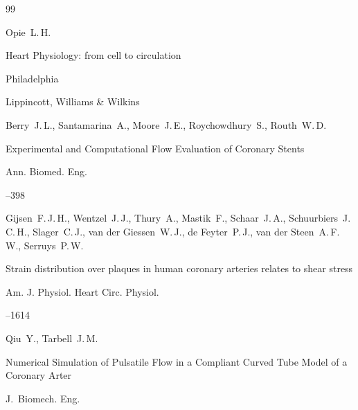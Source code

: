 \begin{thebibliography}{99}




\by Opie~L.\,H. 

\book Heart Physiology: from cell to circulation

\publaddr Philadelphia

\publ Lippincott, Williams \& Wilkins








\by Berry~J.\,L., Santamarina~A., Moore~J.\,E., Roychowdhury~S., Routh~W.\,D.

\paper Experimental and Computational Flow Evaluation of Coronary Stents 

\jour Ann. Biomed. Eng. 



--398







\by Gijsen~F.\,J.\,H., Wentzel~J.\,J., Thury~A., Mastik~F., Schaar~J.\,A., Schuurbiers~J.\,C.\,H., Slager~C.\,J., van der Giessen~W.\,J.,  de Feyter~P.\,J., van der Steen~A.\,F.\,W., Serruys~P.\,W. 

\paper Strain distribution over plaques in human coronary arteries relates to shear stress 

\jour Am. J. Physiol. Heart Circ. Physiol. 



--1614







\by Qiu~Y., Tarbell~J.\,M.

\paper Numerical Simulation of Pulsatile Flow in a Compliant Curved Tube Model of a Coronary Arter

\jour J.~Biomech. Eng. 





\end{thebibliography}
